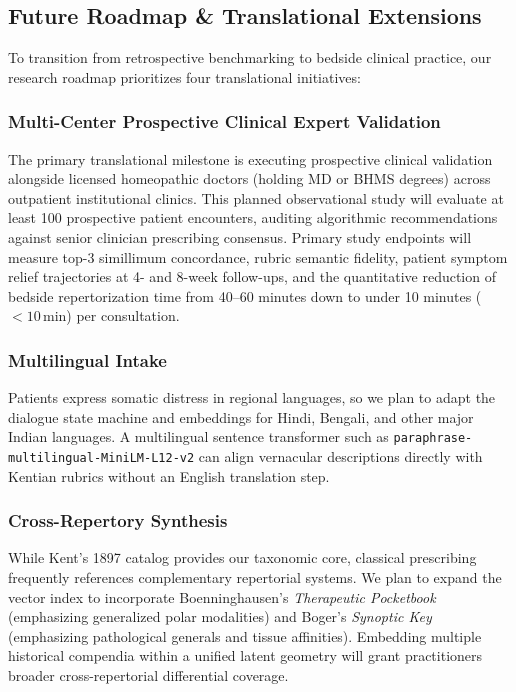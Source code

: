 \subsection{Future Roadmap \& Translational Extensions}

To transition from retrospective benchmarking to bedside clinical practice, our research roadmap prioritizes four translational initiatives:

\subsubsection{Multi-Center Prospective Clinical Expert Validation}
The primary translational milestone is executing prospective clinical validation alongside licensed homeopathic doctors (holding MD or BHMS degrees) across outpatient institutional clinics. This planned observational study will evaluate at least 100 prospective patient encounters, auditing algorithmic recommendations against senior clinician prescribing consensus. Primary study endpoints will measure top-3 simillimum concordance, rubric semantic fidelity, patient symptom relief trajectories at 4- and 8-week follow-ups, and the quantitative reduction of bedside repertorization time from 40--60 minutes down to under 10 minutes ($<10$\,min) per consultation.

\subsubsection{Multilingual Intake}
Patients express somatic distress in regional languages, so we plan to adapt the dialogue state machine and embeddings for Hindi, Bengali, and other major Indian languages. A multilingual sentence transformer such as \texttt{paraphrase-multilingual-MiniLM-L12-v2} can align vernacular descriptions directly with Kentian rubrics without an English translation step.

\subsubsection{Cross-Repertory Synthesis}
While Kent's 1897 catalog provides our taxonomic core, classical prescribing frequently references complementary repertorial systems. We plan to expand the vector index to incorporate Boenninghausen's \textit{Therapeutic Pocketbook} (emphasizing generalized polar modalities) and Boger's \textit{Synoptic Key} (emphasizing pathological generals and tissue affinities). Embedding multiple historical compendia within a unified latent geometry will grant practitioners broader cross-repertorial differential coverage.

